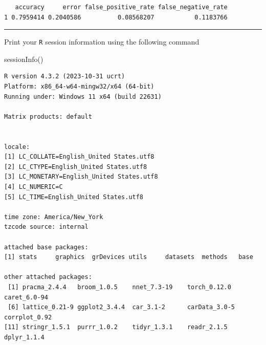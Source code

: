 \documentclass[
  letterpaper,
  DIV=11,
  numbers=noendperiod]{scrartcl}
\newenvironment{Shaded}{\begin{snugshade}}{\end{snugshade}}
\newcommand{\FunctionTok}[1]{\textcolor[rgb]{0.28,0.35,0.67}{#1}}
\newcommand{\NormalTok}[1]{\textcolor[rgb]{0.00,0.23,0.31}{#1}}
\begin{document}
\begin{verbatim}
   accuracy     error false_positive_rate false_negative_rate
1 0.7959414 0.2040586          0.08568207           0.1183766
\end{verbatim}

\pagebreak

\begin{center}\rule{0.5\linewidth}{0.5pt}\end{center}

\begin{tcolorbox}[enhanced jigsaw, leftrule=.75mm, left=2mm, coltitle=black, rightrule=.15mm, titlerule=0mm, colbacktitle=quarto-callout-note-color!10!white, toprule=.15mm, bottomrule=.15mm, opacityback=0, arc=.35mm, colframe=quarto-callout-note-color-frame, title=\textcolor{quarto-callout-note-color}{\faInfo}\hspace{0.5em}{Session Information}, opacitybacktitle=0.6, toptitle=1mm, breakable, bottomtitle=1mm, colback=white]

Print your \texttt{R} session information using the following command

\begin{Shaded}
\begin{Highlighting}[]
\FunctionTok{sessionInfo}\NormalTok{()}
\end{Highlighting}
\end{Shaded}

\begin{verbatim}
R version 4.3.2 (2023-10-31 ucrt)
Platform: x86_64-w64-mingw32/x64 (64-bit)
Running under: Windows 11 x64 (build 22631)

Matrix products: default


locale:
[1] LC_COLLATE=English_United States.utf8 
[2] LC_CTYPE=English_United States.utf8   
[3] LC_MONETARY=English_United States.utf8
[4] LC_NUMERIC=C                          
[5] LC_TIME=English_United States.utf8    

time zone: America/New_York
tzcode source: internal

attached base packages:
[1] stats     graphics  grDevices utils     datasets  methods   base     

other attached packages:
 [1] pracma_2.4.4   broom_1.0.5    nnet_7.3-19    torch_0.12.0   caret_6.0-94  
 [6] lattice_0.21-9 ggplot2_3.4.4  car_3.1-2      carData_3.0-5  corrplot_0.92 
[11] stringr_1.5.1  purrr_1.0.2    tidyr_1.3.1    readr_2.1.5    dplyr_1.1.4   


\end{verbatim}
\end{tcolorbox}
\end{document}
